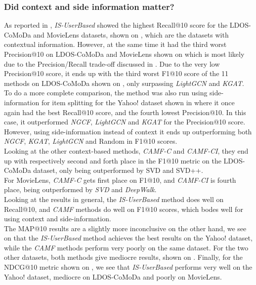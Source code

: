 \subsubsection{Did context and side information matter?}
As reported in , \textit{IS-UserBased} showed the highest Recall@10 score for the LDOS-CoMoDa and MovieLens datasets, shown on , which are the datasets with contextual information.
However, at the same time it had the third worst Precision@10 on LDOS-CoMoDa and MovieLens shown on  which is most likely due to the Precision/Recall trade-off discussed in .
Due to the very low Precision@10 score, it ends up with the third worst F1@10 score of the 11 methods on LDOS-CoMoDa shown on , only surpassing \textit{LightGCN} and \textit{KGAT}.
To do a more complete comparison, the method was also run using side-information for item splitting for the Yahoo! dataset shown in  where it once again had the best Recall@10 score, and the fourth lowest Precision@10.
In this case, it outperformed \textit{NGCF}, \textit{LightGCN} and \textit{KGAT} for the Precision@10 score.
However, using side-information instead of context it ends up outperforming both \textit{NGCF}, \textit{KGAT}, \textit{LightGCN} and Random in F1@10 scores.\\
Looking at the other context-based methods, \textit{CAMF-C} and \textit{CAMF-CI}, they end up with respectively second and forth place in the F1@10 metric on the LDOS-CoMoDa dataset, only being outperformed by SVD and SVD++.\\
For MovieLens, \textit{CAMF-C} gets first place on F1@10, and \textit{CAMF-CI} is fourth place, being outperformed by \textit{SVD} and \textit{DeepWalk}.\\
Looking at the results in general, the \textit{IS-UserBased} method does well on Recall@10, and \textit{CAMF} methods do well on F1@10 scores, which bodes well for using context and side-information.\\
The MAP@10 results are a slightly more inconclusive on the other hand, we see on  that the \textit{IS-UserBased} method achieves the best results on the Yahoo! dataset, while the \textit{CAMF} methods perform very poorly on the same dataset.
For the two other datasets, both methods give mediocre results, shown on .
Finally, for the NDCG@10 metric shown on , we see that \textit{IS-UserBased} performs very well on the Yahoo! dataset, mediocre on LDOS-CoMoDa and poorly on MovieLens.
